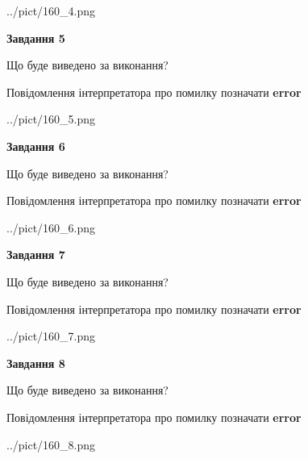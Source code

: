 \documentclass[12pt, ukrainian]{article}
\begin{document}
{\begin{center}
	{../pict/160_4.png}
\end{center}
\newpage

{\begin {center}\textbf{Завдання 5}\end {center}}\par
Що буде виведено за виконання? \par
Повідомлення інтерпретатора про помилку позначати \textbf{error}

\begin{center}
	{../pict/160_5.png}
\end{center}
\newpage

{\begin {center}\textbf{Завдання 6}\end {center}}\par
Що буде виведено за виконання? \par
Повідомлення інтерпретатора про помилку позначати \textbf{error}

\begin{center}
	{../pict/160_6.png}
\end{center}
\newpage

{\begin {center}\textbf{Завдання 7}\end {center}}\par
Що буде виведено за виконання? \par
Повідомлення інтерпретатора про помилку позначати \textbf{error}

\begin{center}
	{../pict/160_7.png}
\end{center}
\newpage

{\begin {center}\textbf{Завдання 8}\end {center}}\par
Що буде виведено за виконання? \par
Повідомлення інтерпретатора про помилку позначати \textbf{error}

\begin{center}
	{../pict/160_8.png}
\end{center}
\newpage

}
\end{document}
